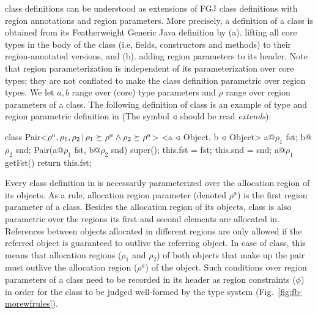 \FB class definitions can be understood as extensions of FGJ class
definitions with region annotations and region parameters. More
precisely, a \fbname definition of a class is obtained from its
Featherweight Generic Java definition by (a). lifting all core types
in the body of the class (i.e, fields, constructors and methods) to
their region-annotated versions, and (b). adding region parameters to
its header. Note that region parameterization is independent of its
parameterization over core types; they are not conflated to make the
class definition parametric over region types. We let $a, b$ range
over (core) type parameters and $\rho$ range over region parameters of
a class. The following definition of  class is an example of
type and region parametric definition in \FB (The symbol $\triangleleft$
should be read \emph{extends}):
\begin{codejava}[mathescape=true]
class Pair<$\rho^a, \rho_1, \rho_2 \,|\, \rho_1 \succeq \rho^a 
                      \wedge \rho_2 \succeq \rho^a$>
          <a $\triangleleft$ Object, b $\triangleleft$ Object> {
  a@$\rho_1$ fst; 
  b@$\rho_2$ snd;
  Pair(a@$\rho_1$ fst, b@$\rho_2$ snd) {
    super(); 
    this.fst = fst; 
    this.snd = snd;
  }
  a@$\rho_1$ getFst() {
    return this.fst;
  }
}
\end{codejava}
Every class definition in \FB is necessarily parameterized over the
allocation region of its objects. As a rule, allocation region
parameter (denoted $\rho^a$) is the first region parameter of a class.
Besides the allocation region of its objects,  class is also
parametric over the regions its first and second elements are
allocated in. References between objects allocated in different
regions are only allowed if the referred object is guaranteed to
outlive the referring object. In case of  class, this means
that allocation regions ($\rho_1$ and $\rho_2$) of both objects that
make up the pair must outlive the allocation region ($\rho^a$) of the
 object. Such conditions over region parameters of a class
need to be recorded in its header as region constraints ($\phi$) in
order for the class to be judged well-formed by the type system
(Fig.~\ref{fig:fb-morewfrules}). 

